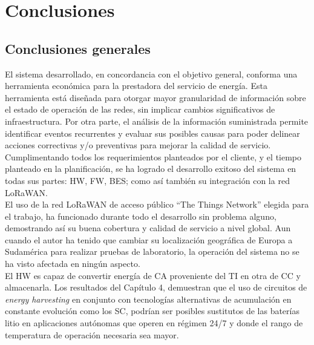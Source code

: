 
\chapter{Conclusiones} %

\label{Chapter5} %




\section{Conclusiones generales }
El sistema desarrollado, en concordancia con el objetivo general, conforma una herramienta económica para la prestadora del servicio de energía. Esta herramienta está diseñada para otorgar mayor granularidad de información sobre el estado de operación de las redes, sin implicar cambios significativos de infraestructura. Por otra parte, el análisis de la información suministrada permite identificar eventos recurrentes y evaluar sus posibles causas para poder delinear acciones correctivas y/o preventivas para mejorar la calidad de servicio.\\
Cumplimentando todos los requerimientos planteados por el cliente, y el tiempo planteado en la planificación, se ha logrado el desarrollo exitoso del sistema en todas sus partes: HW, FW, BES; como así también su integración con la red LoRaWAN.\\
El uso de la red LoRaWAN de acceso público “The Things Network” elegida para el trabajo, ha funcionado durante todo el desarrollo sin problema alguno, demostrando así su buena cobertura y calidad de servicio a nivel global. Aun cuando el autor ha tenido que cambiar su localización geográfica de Europa a Sudamérica para realizar pruebas de laboratorio, la operación del sistema no se ha visto afectada en ningún aspecto.\\
El HW es capaz de convertir energía de CA proveniente del TI en otra de CC y almacenarla. Los resultados del Capítulo 4, demuestran que el uso de circuitos de \textit{energy harvesting} en conjunto con tecnologías alternativas de acumulación en constante evolución como los SC, podrían ser posibles sustitutos de las baterías litio en aplicaciones autónomas que operen en régimen 24/7 y donde el rango de temperatura de operación necesaria sea mayor.\\
